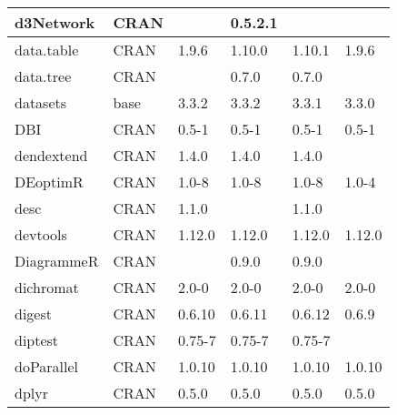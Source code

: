 \begin{longtable}{|llllll|}
d3Network                     & CRAN                      &             & 0.5.2.1     &                &                  \\ \hline
data.table                    & CRAN                      & 1.9.6       & 1.10.0      & 1.10.1         & 1.9.6             \\ \hline \rowcolor{gray!25}
data.tree                     & CRAN                      &             & 0.7.0       & 0.7.0          &                  \\ \hline
datasets                      & base                      & 3.3.2       & 3.3.2       & 3.3.1          & 3.3.0             \\ \hline \rowcolor{gray!25}
DBI                           & CRAN                      & 0.5-1       & 0.5-1       & 0.5-1          & 0.5-1            \\ \hline
dendextend                    & CRAN                      & 1.4.0       & 1.4.0       & 1.4.0          &                   \\ \hline \rowcolor{gray!25}
DEoptimR                      & CRAN                      & 1.0-8       & 1.0-8       & 1.0-8          & 1.0-4            \\ \hline
desc                          & CRAN                      & 1.1.0       &             & 1.1.0          &                   \\ \hline \rowcolor{gray!25}
devtools                      & CRAN                      & 1.12.0      & 1.12.0      & 1.12.0         & 1.12.0           \\ \hline
DiagrammeR                    & CRAN                      &             & 0.9.0       & 0.9.0          &                   \\ \hline \rowcolor{gray!25}
dichromat                     & CRAN                      & 2.0-0       & 2.0-0       & 2.0-0          & 2.0-0            \\ \hline
digest                        & CRAN                      & 0.6.10      & 0.6.11      & 0.6.12         & 0.6.9             \\ \hline \rowcolor{gray!25}
diptest                       & CRAN                      & 0.75-7      & 0.75-7      & 0.75-7         &                  \\ \hline
doParallel                    & CRAN                      & 1.0.10      & 1.0.10      & 1.0.10         & 1.0.10            \\ \hline \rowcolor{gray!25}
dplyr                         & CRAN                      & 0.5.0       & 0.5.0       & 0.5.0          & 0.5.0            \\ \hline

\end{longtable}
